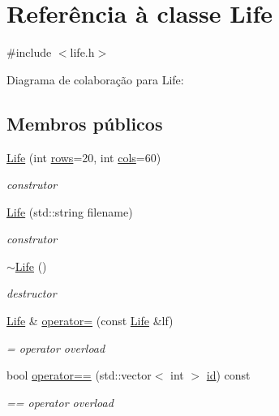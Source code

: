 \hypertarget{classLife}{}\section{Referência à classe Life}
\label{classLife}


{\ttfamily \#include $<$life.\+h$>$}



Diagrama de colaboração para Life\+:
\subsection*{Membros públicos}
\begin{DoxyCompactItemize}
\item 
\hyperlink{classLife_a240039599d8a70206d1047e947eb5a24}{Life} (int \hyperlink{classLife_ab4d1ea4344ba31a4686f388edb7e2927}{rows}=20, int \hyperlink{classLife_a31a428734f7dc76ca386963139699ac6}{cols}=60)
\begin{DoxyCompactList}\small\item\em construtor \end{DoxyCompactList}\item 
\hyperlink{classLife_a7bd6ea2ee09bf001bbbd58c6eef26e24}{Life} (std\+::string filename)
\begin{DoxyCompactList}\small\item\em construtor \end{DoxyCompactList}\item 
\hyperlink{classLife_ac5a521e06906fb4f834001b2b4f7adc7}{$\sim$\+Life} ()
\begin{DoxyCompactList}\small\item\em destructor \end{DoxyCompactList}\item 
\hyperlink{classLife}{Life} \& \hyperlink{classLife_a79902e1e85146df19fb2b920899a5a36}{operator=} (const \hyperlink{classLife}{Life} \&lf)
\begin{DoxyCompactList}\small\item\em = operator overload \end{DoxyCompactList}\item 
bool \hyperlink{classLife_ae0d444c42adbb8784684f2a9ef008bcb}{operator==} (std\+::vector$<$ int $>$ \hyperlink{classLife_ab33d6ee162673a71742a3df07a0a2e2f}{id}) const
\begin{DoxyCompactList}\small\item\em == operator overload \end{DoxyCompactList}\item 

\end{DoxyCompactItemize}
